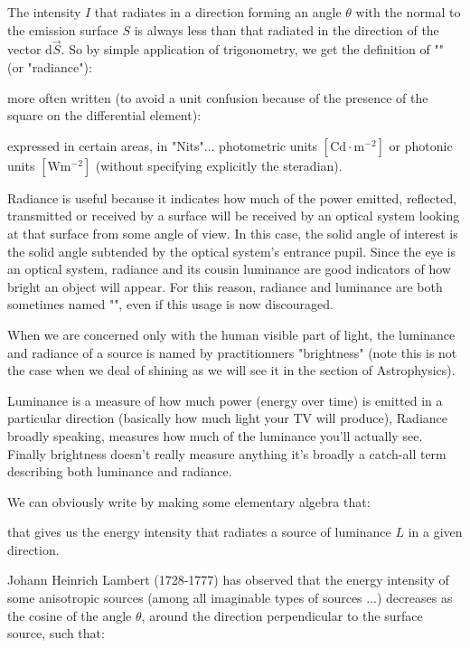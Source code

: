 	The intensity $I$ that radiates in a direction forming an angle $\theta$ with the normal to the emission surface $S$ is always less than that radiated in the direction of the vector $\mathrm{d}\vec{S}$. So by simple application of trigonometry, we get the definition of "" (or "radiance"):
	
	more often written (to avoid a unit confusion because of the presence of the square on the differential element):
	
	expressed in certain areas, in "Nits"... photometric units  $[\text{Cd}\cdot\text{m}^{-2}]$ or photonic units $[\text{W}\text{m}^{-2}]$ (without specifying explicitly the steradian).
	
	Radiance is useful because it indicates how much of the power emitted, reflected, transmitted or received by a surface will be received by an optical system looking at that surface from some angle of view. In this case, the solid angle of interest is the solid angle subtended by the optical system's entrance pupil. Since the eye is an optical system, radiance and its cousin luminance are good indicators of how bright an object will appear. For this reason, radiance and luminance are both sometimes named "", even if this usage is now discouraged.
	\begin{tcolorbox}[title=Remark,colframe=black,arc=10pt]
	When we are concerned only with the human visible part of light, the luminance and radiance of a source is named by practitionners "brightness" (note this is not the case when we deal of shining as we will see it in the section of Astrophysics).
	\end{tcolorbox}	
	Luminance is a measure of how much power (energy over time) is emitted in a particular direction (basically how much light your TV will produce), Radiance broadly speaking, measures how much of the luminance you'll actually see. Finally brightness doesn't really measure anything it's broadly a catch-all term describing both luminance and radiance.
	
	We can obviously write by making some elementary algebra that:
	
	that gives us the energy intensity that radiates a source of luminance $L$ in a given direction.

	Johann Heinrich Lambert (1728-1777) has observed that the energy intensity of some anisotropic sources (among all imaginable types of sources ...) decreases as the cosine of the angle $\theta$, around the direction perpendicular to the surface source, such that:
 	
